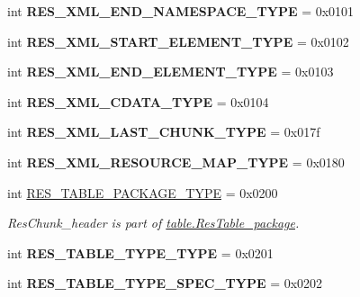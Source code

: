 \begin{DoxyCompactItemize}
\item 
\mbox{\label{classtypes_1_1ResourceType_a2a72437da2610536004e3dd2ca1c9ad6}} 
int {\bfseries R\+E\+S\+\_\+\+X\+M\+L\+\_\+\+E\+N\+D\+\_\+\+N\+A\+M\+E\+S\+P\+A\+C\+E\+\_\+\+T\+Y\+PE} = 0x0101
\item 
\mbox{\label{classtypes_1_1ResourceType_ae1505f158fdfeaaa2cc08d40a4733fec}} 
int {\bfseries R\+E\+S\+\_\+\+X\+M\+L\+\_\+\+S\+T\+A\+R\+T\+\_\+\+E\+L\+E\+M\+E\+N\+T\+\_\+\+T\+Y\+PE} = 0x0102
\item 
\mbox{\label{classtypes_1_1ResourceType_a3458709701227c6125a93f4235b1c791}} 
int {\bfseries R\+E\+S\+\_\+\+X\+M\+L\+\_\+\+E\+N\+D\+\_\+\+E\+L\+E\+M\+E\+N\+T\+\_\+\+T\+Y\+PE} = 0x0103
\item 
\mbox{\label{classtypes_1_1ResourceType_ad9047d84e914212add448c78a1b1cf14}} 
int {\bfseries R\+E\+S\+\_\+\+X\+M\+L\+\_\+\+C\+D\+A\+T\+A\+\_\+\+T\+Y\+PE} = 0x0104
\item 
\mbox{\label{classtypes_1_1ResourceType_add69c5e751d386d165f0935594fe0a09}} 
int {\bfseries R\+E\+S\+\_\+\+X\+M\+L\+\_\+\+L\+A\+S\+T\+\_\+\+C\+H\+U\+N\+K\+\_\+\+T\+Y\+PE} = 0x017f
\item 
\mbox{\label{classtypes_1_1ResourceType_a359d859afadbf01dad4b6c5e863d7564}} 
int {\bfseries R\+E\+S\+\_\+\+X\+M\+L\+\_\+\+R\+E\+S\+O\+U\+R\+C\+E\+\_\+\+M\+A\+P\+\_\+\+T\+Y\+PE} = 0x0180
\item 
\mbox{\label{classtypes_1_1ResourceType_a0192fd63a216e2eab1ef30f019c88cd6}} 
int \mbox{\hyperlink{classtypes_1_1ResourceType_a0192fd63a216e2eab1ef30f019c88cd6}{R\+E\+S\+\_\+\+T\+A\+B\+L\+E\+\_\+\+P\+A\+C\+K\+A\+G\+E\+\_\+\+T\+Y\+PE}} = 0x0200
\begin{DoxyCompactList}\small\item\em Res\+Chunk\+\_\+header is part of \mbox{\hyperlink{}{table.\+Res\+Table\+\_\+package}}. \end{DoxyCompactList}\item 
\mbox{\label{classtypes_1_1ResourceType_afda9b8108a2498a4624c541186ac8e03}} 
int {\bfseries R\+E\+S\+\_\+\+T\+A\+B\+L\+E\+\_\+\+T\+Y\+P\+E\+\_\+\+T\+Y\+PE} = 0x0201
\item 
\mbox{\label{classtypes_1_1ResourceType_a60fb07b4c4092ed99b7fe52b5848354c}} 
int {\bfseries R\+E\+S\+\_\+\+T\+A\+B\+L\+E\+\_\+\+T\+Y\+P\+E\+\_\+\+S\+P\+E\+C\+\_\+\+T\+Y\+PE} = 0x0202
\end{DoxyCompactItemize}
